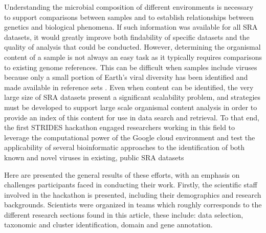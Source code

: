 Understanding the microbial composition of different environments is necessary
to support comparisons between samples and to establish relationships between
genetics and biological phenomena. If such information was available for all
SRA datasets, it would greatly improve both findability of specific datasets
and the quality of analysis that could be conducted. However, determining the
organismal content of a sample is not always an easy task as it typically
requires comparisons to existing genome references. This can be difficult when
samples include viruses because only a small portion of Earth’s viral diversity
has been identified and made available in reference sets \cite{Carroll2018}.
Even when content can be identified, the very large size of SRA datasets
present a significant scalability problem, and strategies must be developed to
support large scale organismal content analysis in order to provide an index of
this content for use in data search and retrieval. To that end, the first
STRIDES hackathon engaged researchers working in this field to leverage the
computational power of the Google cloud environment and test the applicability
of several bioinformatic approaches to the identification of both known and
novel viruses in existing, public SRA datasets

Here are presented the general results of these efforts, with an emphasis on
challenges participants faced in conducting their work. Firstly, the scientific
staff involved in the hackathon is presented, including their demographics and
research backgrounds. Scientists were organized in teams which roughly
corresponds to the different research sections found in this article, these
include: data selection, taxonomic and cluster identification, domain and gene
annotation.
